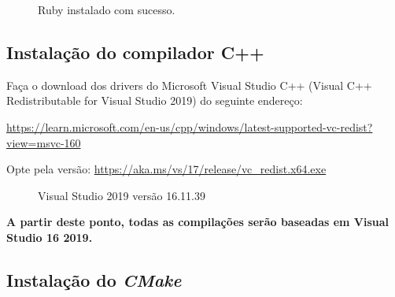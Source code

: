 \documentclass[a4paper,11pt]{article}
\newcommand{\cmake}{\textit{CMake}}
\newcommand{\cautionbox}[1]{
	\vskip 5mm
	\begin{leftbar}
		\textbf{#1}
	\end{leftbar}
	\vskip 5mm
}
\begin{document}
\begin{figure}[H]
	\centering
	\caption{Ruby instalado com sucesso.}
	\label{fig:ruby_install_1}
\end{figure}

\subsection*{Instalação do compilador C++}
\label{compilador}

Faça o download dos drivers do Microsoft Visual Studio C++ (Visual C++ Redistributable for Visual Studio 2019) do seguinte endereço:

\url{https://learn.microsoft.com/en-us/cpp/windows/latest-supported-vc-redist?view=msvc-160}

Opte pela versão: \url{https://aka.ms/vs/17/release/vc_redist.x64.exe}

\begin{figure}[H]
	\centering
	\caption{Visual Studio 2019 versão 16.11.39}\label{fig:msvc_build_2019}
\end{figure}

\cautionbox{\color{purple}A partir deste ponto, todas as compilações serão baseadas em \textbf{Visual Studio 16 2019}.}

\subsection*{Instalação do \cmake{}}
\label{cmake}
\end{document}
